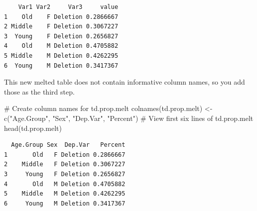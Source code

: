\documentclass[
  10pt,
  letterpaper]{article}
\newenvironment{Shaded}{\begin{snugshade}}{\end{snugshade}}
\newcommand{\AttributeTok}[1]{\textcolor[rgb]{0.40,0.45,0.13}{#1}}
\newcommand{\CommentTok}[1]{\textcolor[rgb]{0.37,0.37,0.37}{#1}}
\newcommand{\DecValTok}[1]{\textcolor[rgb]{0.68,0.00,0.00}{#1}}
\newcommand{\FunctionTok}[1]{\textcolor[rgb]{0.28,0.35,0.67}{#1}}
\newcommand{\NormalTok}[1]{\textcolor[rgb]{0.00,0.23,0.31}{#1}}
\newcommand{\OtherTok}[1]{\textcolor[rgb]{0.00,0.23,0.31}{#1}}
\newcommand{\SpecialCharTok}[1]{\textcolor[rgb]{0.37,0.37,0.37}{#1}}
\newcommand{\StringTok}[1]{\textcolor[rgb]{0.13,0.47,0.30}{#1}}
\begin{document}
\begin{Shaded}
\end{Shaded}

\begin{verbatim}
    Var1 Var2     Var3     value
1    Old    F Deletion 0.2866667
2 Middle    F Deletion 0.3067227
3  Young    F Deletion 0.2656827
4    Old    M Deletion 0.4705882
5 Middle    M Deletion 0.4262295
6  Young    M Deletion 0.3417367
\end{verbatim}

This new melted table does not contain informative column names, so you
add those as the third step.

\begin{Shaded}
\begin{Highlighting}[]
\CommentTok{\# Create column names for td.prop.melt}
\FunctionTok{colnames}\NormalTok{(td.prop.melt) }\OtherTok{\textless{}{-}} \FunctionTok{c}\NormalTok{(}\StringTok{"Age.Group"}\NormalTok{, }\StringTok{"Sex"}\NormalTok{, }\StringTok{"Dep.Var"}\NormalTok{,}
    \StringTok{"Percent"}\NormalTok{)}
\CommentTok{\# View first six lines of td.prop.melt}
\FunctionTok{head}\NormalTok{(td.prop.melt)}
\end{Highlighting}
\end{Shaded}

\begin{verbatim}
  Age.Group Sex  Dep.Var   Percent
1       Old   F Deletion 0.2866667
2    Middle   F Deletion 0.3067227
3     Young   F Deletion 0.2656827
4       Old   M Deletion 0.4705882
5    Middle   M Deletion 0.4262295
6     Young   M Deletion 0.3417367
\end{verbatim}
\end{document}
